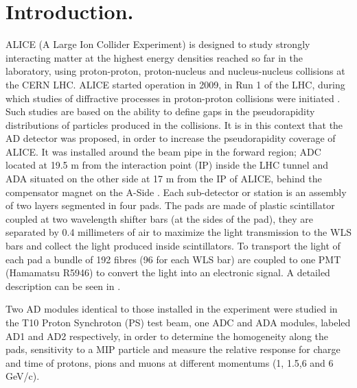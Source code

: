 \section{Introduction.}

ALICE (A Large Ion Collider Experiment) \cite{AlicePerformance} is designed to study strongly
interacting matter at the highest energy densities reached so far in the laboratory, using
proton-proton, proton-nucleus and 
nucleus-nucleus collisions at the CERN LHC. ALICE started operation in 2009, in Run 1 of the LHC,
during which studies of diffractive processes in proton-proton collisions were initiated
\cite{Villalobos, Evdokimov}. Such studies are based on the ability to define gaps in the
pseudorapidity distributions of particles produced in the collisions. 
It is in this context that the AD detector was proposed, in order to increase the pseudorapidity
coverage of ALICE. 
It was installed around the beam pipe in the forward region; ADC located at 19.5 m from the
interaction point (IP) inside the LHC tunnel and ADA situated on the other side at 17 m from the
IP of ALICE, behind the compensator magnet on the A-Side \cite{ADNote, AD-Villatoro}.
% 
Each sub-detector or station is an assembly of two layers segmented in four pads. 
The pads are made of plastic scintillator coupled at %
two wavelength shifter bars (at the sides of the pad), they are separated by 0.4 millimeters of
air to maximize the light transmission to the WLS bars and collect the light produced inside
scintillators.
%
To transport the light of each pad a bundle of 192 fibres (96 for each WLS bar) are coupled to one
PMT (Hamamatsu R5946) to convert the light into an electronic signal. A detailed description can
be seen in \cite{ADNote}.

Two AD modules identical to those installed in the experiment were studied in the T10 Proton
Synchroton (PS) test beam, one ADC and  ADA modules, labeled AD1 and AD2 respectively, in order to
determine the homogeneity along the pads, sensitivity to a MIP particle and measure the relative
response for charge and time of protons, pions and muons at different momentums (1, 1.5,6 and 6 GeV/c). 

